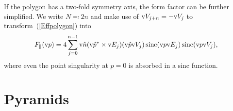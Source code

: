 If the polygon has a two-fold symmetry axis,
the form factor can be further simplified.
We write $N\eqqcolon2n$
and make use of $\text{v}{V}_{j+n}=-\text{v}{V}_j$ to transform~(\ref{Effpolygon}) into
\begin{equation}\label{Eff2ngon}
    F_\parallel(\text{v}{p}) = \displaystyle 4 \sum_{j=0}^{n-1}
              \text{v}{\hat n}(\text{v}{\hat p}^*\times\text{v}{E}_j) (\text{v}{\hat p}\text{v}{V}_j) \operatorname{sinc}(\text{v}{p}\text{v}{E}_j) \operatorname{sinc}(\text{v}{p}\text{v}{V}_j),
\end{equation}
where even the point singularity at $p=0$ is absorbed in a sinc function.
%
%

\section{Pyramids}

%
%
%
%

